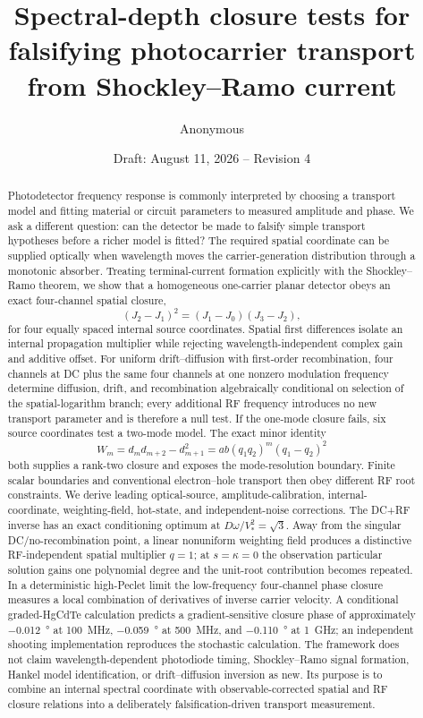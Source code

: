 \documentclass[11pt]{article}
\title{Spectral-depth closure tests for falsifying photocarrier transport from Shockley--Ramo current}
\author{Anonymous}
\date{Draft: August 11, 2026 -- Revision 4}
\begin{document}
\maketitle

\begin{abstract}
Photodetector frequency response is commonly interpreted by choosing a transport model and fitting material or circuit parameters to measured amplitude and phase. We ask a different question: can the detector be made to falsify simple transport hypotheses before a richer model is fitted? The required spatial coordinate can be supplied optically when wavelength moves the carrier-generation distribution through a monotonic absorber. Treating terminal-current formation explicitly with the Shockley--Ramo theorem, we show that a homogeneous one-carrier planar detector obeys an exact four-channel spatial closure,
\begin{equation*}
(J_2-J_1)^2=(J_1-J_0)(J_3-J_2),
\end{equation*}
for four equally spaced internal source coordinates. Spatial first differences isolate an internal propagation multiplier while rejecting wavelength-independent complex gain and additive offset. For uniform drift--diffusion with first-order recombination, four channels at DC plus the same four channels at one nonzero modulation frequency determine diffusion, drift, and recombination algebraically conditional on selection of the spatial-logarithm branch; every additional RF frequency introduces no new transport parameter and is therefore a null test. If the one-mode closure fails, six source coordinates test a two-mode model. The exact minor identity
\begin{equation*}
W_m=d_m d_{m+2}-d_{m+1}^2
=ab(q_1q_2)^m(q_1-q_2)^2
\end{equation*}
both supplies a rank-two closure and exposes the mode-resolution boundary. Finite scalar boundaries and conventional electron--hole transport then obey different RF root constraints. We derive leading optical-source, amplitude-calibration, internal-coordinate, weighting-field, hot-state, and independent-noise corrections. The DC+RF inverse has an exact conditioning optimum at $D\omega/V_*^2=\sqrt{3}$. Away from the singular DC/no-recombination point, a linear nonuniform weighting field produces a distinctive RF-independent spatial multiplier $q=1$; at $s=\kappa=0$ the observation particular solution gains one polynomial degree and the unit-root contribution becomes repeated. In a deterministic high-Peclet limit the low-frequency four-channel phase closure measures a local combination of derivatives of inverse carrier velocity. A conditional graded-HgCdTe calculation predicts a gradient-sensitive closure phase of approximately \SI{-0.012}{\degree} at \SI{100}{MHz}, \SI{-0.059}{\degree} at \SI{500}{MHz}, and \SI{-0.110}{\degree} at \SI{1}{GHz}; an independent shooting implementation reproduces the stochastic calculation. The framework does not claim wavelength-dependent photodiode timing, Shockley--Ramo signal formation, Hankel model identification, or drift--diffusion inversion as new. Its purpose is to combine an internal spectral coordinate with observable-corrected spatial and RF closure relations into a deliberately falsification-driven transport measurement.

\end{abstract}
\end{document}
